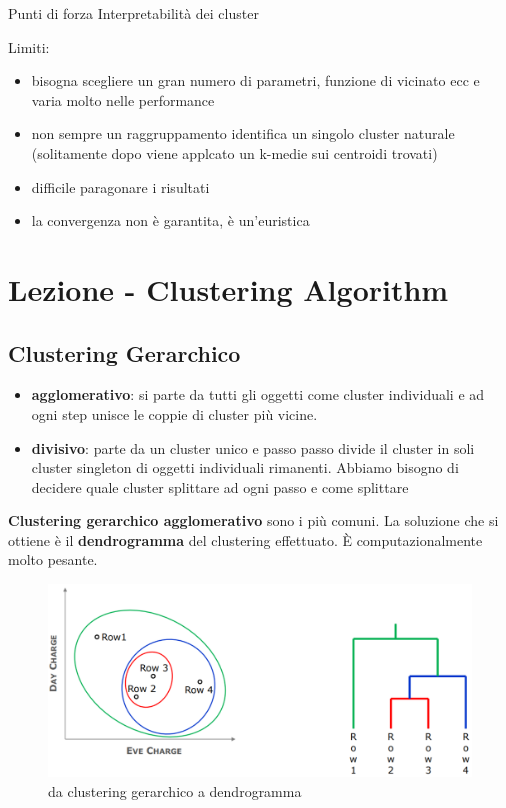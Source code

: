 Punti di forza Interpretabilit\`a dei cluster 

Limiti:
\begin{itemize}
	\item bisogna scegliere un gran numero di parametri, funzione di vicinato ecc e varia molto nelle performance
	\item non sempre un raggruppamento identifica un singolo cluster naturale (solitamente dopo viene applcato un k-medie sui centroidi trovati)
	\item difficile paragonare i risultati
	\item la convergenza non \`e garantita, \`e un'euristica
\end{itemize}

\section{Lezione - Clustering Algorithm}

\subsection{Clustering Gerarchico}
\begin{itemize}
	\item \textbf{agglomerativo}: si parte da tutti gli oggetti come cluster individuali e ad ogni step unisce le coppie di cluster pi\`u vicine.
	\item \textbf{divisivo}: parte da un cluster unico e passo passo divide il cluster in soli cluster singleton di oggetti individuali rimanenti. Abbiamo bisogno di decidere quale cluster splittare ad ogni passo e come splittare
\end{itemize}

\textbf{Clustering gerarchico agglomerativo} sono i pi\`u comuni. La soluzione che si ottiene \`e il \textbf{dendrogramma} del clustering effettuato. \`E computazionalmente molto pesante.

\begin{figure}[h!]
	\centering
	\includegraphics[height=0.45 \linewidth]{clustering/pict/cluster_aggl.png}
	\caption{da clustering gerarchico a dendrogramma}
\end{figure}

